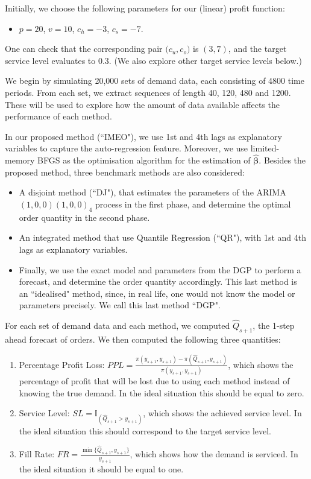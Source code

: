 \documentclass{article}
\begin{document}
Initially, we choose the following parameters for our (linear) profit function:
\begin{itemize}
    \item $p=20$, $v=10$, $c_h=-3$, $c_s=-7$.
\end{itemize}
One can check that the corresponding pair $\big( c_u,c_o \big)$ is $(3,7)$, and the target service level evaluates to $0.3$. (We also explore other target service levels below.)

We begin by simulating 20,000 sets of demand data, each consisting of 4800 time periods. From each set, we extract sequences of length 40, 120, 480 and 1200. These will be used to explore how the amount of data available affects the performance of each method.

In our proposed method (``IMEO"), we use 1st and 4th lags as explanatory variables to capture the auto-regression feature. Moreover, we use limited-memory BFGS \cite{LN89} as the optimisation algorithm for the estimation of $\hat{\boldsymbol{\beta}}$. Besides the proposed method, three benchmark methods are also considered:
\begin{itemize}
    \item A disjoint method (``DJ"), that estimates the parameters of the ARIMA$(1,0,0)(1,0,0)_4$ process in the first phase, and determine the optimal order quantity in the second phase.
    \item An integrated method that use Quantile Regression (``QR"), with 1st and 4th lags as explanatory variables.
    \item Finally, we use the exact model and parameters from the DGP to perform a forecast, and determine the order quantity accordingly. This last method is an ``idealised" method, since, in real life, one would not know the model or parameters precisely. We call this last method ``DGP".
\end{itemize}

For each set of demand data and each method, we computed $\hat{Q}_{s+1}$, the 1-step ahead forecast of orders. We then computed the following three quantities:
\begin{enumerate}
    \item Percentage Profit Loss:  $PPL=\frac{\pi(y_{s+1},y_{s+1})-\pi(\hat{Q}_{s+1},y_{s+1})}{\pi(y_{s+1},y_{s+1})}$, which shows the percentage of profit that will be lost due to using each method instead of knowing the true demand. In the ideal situation this should be equal to zero.
    \item Service Level: $SL=\mathbb {I}_{(\hat{Q}_{s+1}>y_{s+1})}$, which shows the achieved service level. In the ideal situation this should correspond to the target service level.
    \item Fill Rate: $FR=\frac{\min\{\hat{Q}_{s+1},y_{s+1}\}}{y_{s+1}}$, which shows how the demand is serviced. In the ideal situation it should be equal to one.
\end{enumerate}
\end{document}

